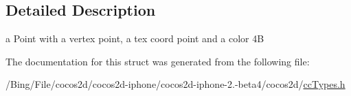\subsection{Detailed Description}
a Point with a vertex point, a tex coord point and a color 4\-B 

The documentation for this struct was generated from the following file\-:\begin{DoxyCompactItemize}
\item 
/\-Bing/\-File/cocos2d/cocos2d-\/iphone/cocos2d-\/iphone-\/2.-\/beta4/cocos2d/\hyperlink{cc_types_8h}{cc\-Types.\-h}\end{DoxyCompactItemize}
